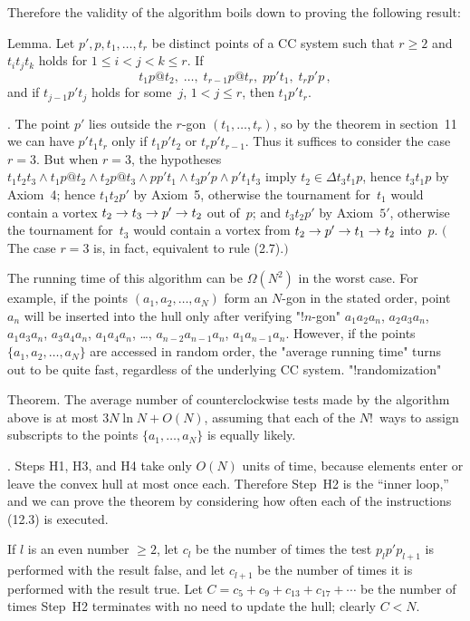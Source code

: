 Therefore the validity of the algorithm boils down to proving the
following result:

\proclaim Lemma. Let\/ $p',p,t_1,\ldots,t_r$ be distinct points of a CC
system such that\/ $r\geq 2$ and\/ $t_it_jt_k$ holds for\/ $1\leq i<j<k\leq
r$. If
$$t_1p@t_2,\;\ldots,\;t_{r-1}p@ t_r,\;pp't_1,\;t_rp'p\,,$$
and if\/ $t_{j-1}p't_j$ holds for some\/~$j$, $1<j\leq r$, then\/
$t_1p't_r$.

.\quad
The point $p'$ lies outside the $r$-gon $(t_1,\ldots,t_r)$, so by the
theorem in section~11 we can have $p't_1t_r$ only if $t_1p't_2$ or
$t_rp't_{r-1}$. Thus it suffices to consider the case $r=3$. But when
$r=3$, the hypotheses $t_1t_2t_3\wedge t_1p@ t_2\wedge 
t_2p@ t_3\wedge pp't_1\wedge t_3p'p\wedge p't_1t_3$ 
imply $t_2\in\Delta t_3t_1p$,
hence $t_3t_1p$ by Axiom~4; hence $t_1t_2p'$ by Axiom~5, otherwise the
tournament for~$t_1$ would contain a vortex  $t_2\rightarrow t_3\rightarrow p'\rightarrow
t_2$ out of~$p$; and $t_3t_2p'$ by Axiom~$5'$, otherwise the
tournament for~$t_3$ would contain a vortex from $t_2\rightarrow p'\rightarrow t_1\rightarrow
t_2$ into~$p$. $\bigl($The case $r=3$ is, in fact, equivalent to rule
(2.7).$\bigr)$\quad\pfbox

\bigskip
The running time of this algorithm can be $\Omega(N^2)$ in the worst
case. For example, if the points $(a_1,a_2,\ldots,a_N)$ form an
$N$-gon in the stated order, point~$a_n$ will be inserted into the
hull only after verifying "!$n$-gon"
$a_1a_2a_n$, $a_2a_3a_n$, $a_1a_3a_n$, $a_3a_4a_n$, $a_1a_4a_n$,
\dots, $a_{n-2}a_{n-1}a_n$, $a_1a_{n-1}a_n$.
However, if the points $\{a_1,a_2,\ldots,a_N\}$ are accessed in random
order, the "average running time" turns out to be quite fast, regardless
of the underlying CC system. "!randomization"

\proclaim Theorem. The average number of counterclockwise tests made
by the algorithm above is at most\/ $3N\ln N+O(N)$, assuming that each
of the\/ $N!$~ways to assign subscripts to the points\/
 $\{a_1,\ldots,a_N\}$ is equally likely.

.\quad
Steps H1, H3, and H4  take only $O(N)$ units of time, because elements
enter or leave the convex hull at most once each. Therefore Step~H2 is
the ``inner loop,'' and we can prove the theorem by considering how
often each of the instructions (12.3) is executed.

If $l$ is an even number $\geq 2$, let $c_l$ be the number of times
the test $p_lp'p_{l+1}$ is performed with the result false, and let
$c_{l+1}$ be the number of times it is performed with the result true.
Let $C=c_5+c_9+c_{13}+c_{17}+\cdots$ be the number of times Step~H2
terminates with no need to update the hull; clearly $C<N$.

